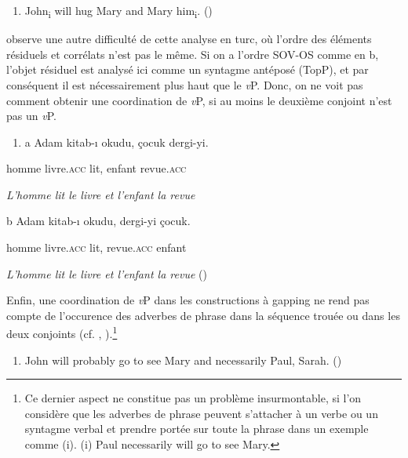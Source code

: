 \begin{enumerate}
\item \label{bkm:Ref288645246}John\textsubscript{i} will hug Mary and Mary him\textsubscript{i}.            (\citet[205]{Ince2009})


\end{enumerate}
\citet{Ince2009} observe une autre difficulté de cette analyse en turc, où l'ordre des éléments résiduels et corrélats n'est pas le même. Si on a l'ordre SOV-OS comme en b, l'objet résiduel est analysé ici comme un syntagme antéposé (TopP), et par conséquent il est nécessairement plus haut que le \textit{v}P. Donc, on ne voit pas comment obtenir une coordination de \textit{v}P, si au moins le deuxième conjoint n'est pas un \textit{v}P.


\begin{enumerate}
\item \label{bkm:Ref288644219}a  Adam kitab-{\i} okudu, çocuk dergi-yi.


\end{enumerate}
homme livre.\textsc{acc} lit, enfant revue.\textsc{acc}

{\itshape
L'homme lit le livre et l'enfant la revue}

 b  Adam kitab-{\i} okudu, dergi-yi çocuk.

homme livre.\textsc{acc} lit, revue.\textsc{acc} enfant

\textit{L'homme lit le livre et l'enfant la revue}      (\citet[199]{Ince2009})

Enfin, une coordination de \textit{v}P dans les constructions à gapping ne rend pas compte de l'occurence des adverbes de phrase dans la séquence trouée ou dans les deux conjoints (cf. \citet{Gardent1991}, \citet{Ince2009}).\footnote{Ce dernier aspect ne constitue pas un problème insurmontable, si l'on considère que les adverbes de phrase peuvent s'attacher à un verbe ou un syntagme verbal et prendre portée sur toute la phrase dans un exemple comme (i).
(i)  Paul necessarily will go to see Mary.}  


\begin{enumerate}
\item John will probably go to see Mary and necessarily Paul, Sarah.  (\citet[49]{Gardent1991})


\end{enumerate}
